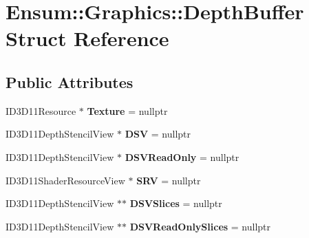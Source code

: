 \hypertarget{struct_ensum_1_1_graphics_1_1_depth_buffer}{}\section{Ensum\+:\+:Graphics\+:\+:Depth\+Buffer Struct Reference}
\label{struct_ensum_1_1_graphics_1_1_depth_buffer}
\subsection*{Public Attributes}
\begin{DoxyCompactItemize}
\item 
I\+D3\+D11\+Resource $\ast$ {\bfseries Texture} = nullptr\hypertarget{struct_ensum_1_1_graphics_1_1_depth_buffer_a5cdab429ed3f314664397b7c22ad9cb0}{}\label{struct_ensum_1_1_graphics_1_1_depth_buffer_a5cdab429ed3f314664397b7c22ad9cb0}

\item 
I\+D3\+D11\+Depth\+Stencil\+View $\ast$ {\bfseries D\+SV} = nullptr\hypertarget{struct_ensum_1_1_graphics_1_1_depth_buffer_a814cdc40ae92b5c3eeeb357891409570}{}\label{struct_ensum_1_1_graphics_1_1_depth_buffer_a814cdc40ae92b5c3eeeb357891409570}

\item 
I\+D3\+D11\+Depth\+Stencil\+View $\ast$ {\bfseries D\+S\+V\+Read\+Only} = nullptr\hypertarget{struct_ensum_1_1_graphics_1_1_depth_buffer_af0725e42b872cf226376dd95a40d5be4}{}\label{struct_ensum_1_1_graphics_1_1_depth_buffer_af0725e42b872cf226376dd95a40d5be4}

\item 
I\+D3\+D11\+Shader\+Resource\+View $\ast$ {\bfseries S\+RV} = nullptr\hypertarget{struct_ensum_1_1_graphics_1_1_depth_buffer_a3b850a6be4b660aeb516db7d4dd766ba}{}\label{struct_ensum_1_1_graphics_1_1_depth_buffer_a3b850a6be4b660aeb516db7d4dd766ba}

\item 
I\+D3\+D11\+Depth\+Stencil\+View $\ast$$\ast$ {\bfseries D\+S\+V\+Slices} = nullptr\hypertarget{struct_ensum_1_1_graphics_1_1_depth_buffer_a77e80fa29a60d70965b88c856b7168e2}{}\label{struct_ensum_1_1_graphics_1_1_depth_buffer_a77e80fa29a60d70965b88c856b7168e2}

\item 
I\+D3\+D11\+Depth\+Stencil\+View $\ast$$\ast$ {\bfseries D\+S\+V\+Read\+Only\+Slices} = nullptr\hypertarget{struct_ensum_1_1_graphics_1_1_depth_buffer_a1fc14b666064c66af03b00166212c12a}{}\label{struct_ensum_1_1_graphics_1_1_depth_buffer_a1fc14b666064c66af03b00166212c12a}


\end{DoxyCompactItemize}
